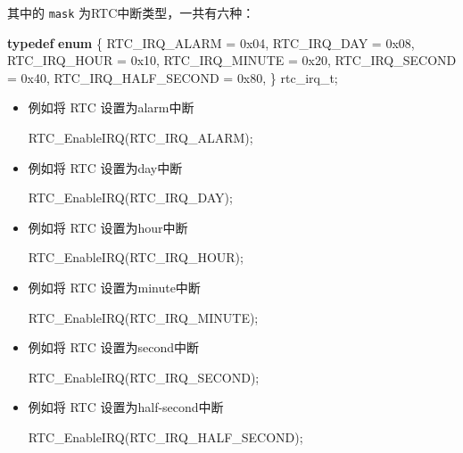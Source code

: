 \documentclass[
  12pt,
]{book}
\newenvironment{Shaded}{\begin{snugshade}}{\end{snugshade}}
\newcommand{\BaseNTok}[1]{\textcolor[rgb]{0.00,0.00,0.81}{#1}}
\newcommand{\KeywordTok}[1]{\textcolor[rgb]{0.13,0.29,0.53}{\textbf{#1}}}
\newcommand{\NormalTok}[1]{#1}
\begin{document}
其中的 \texttt{mask} 为RTC中断类型，一共有六种：

\begin{Shaded}
\begin{Highlighting}[]
\KeywordTok{typedef} \KeywordTok{enum}
\NormalTok{\{}
\NormalTok{    RTC_IRQ_ALARM = }\BaseNTok{0x04}\NormalTok{,}
\NormalTok{    RTC_IRQ_DAY = }\BaseNTok{0x08}\NormalTok{,}
\NormalTok{    RTC_IRQ_HOUR = }\BaseNTok{0x10}\NormalTok{,}
\NormalTok{    RTC_IRQ_MINUTE = }\BaseNTok{0x20}\NormalTok{,}
\NormalTok{    RTC_IRQ_SECOND = }\BaseNTok{0x40}\NormalTok{,}
\NormalTok{    RTC_IRQ_HALF_SECOND = }\BaseNTok{0x80}\NormalTok{,}
\NormalTok{\} rtc_irq_t;}
\end{Highlighting}
\end{Shaded}

\begin{itemize}
\item
  例如将 RTC 设置为alarm中断

\begin{Shaded}
\begin{Highlighting}[]
\NormalTok{RTC_EnableIRQ(RTC_IRQ_ALARM);}
\end{Highlighting}
\end{Shaded}
\item
  例如将 RTC 设置为day中断

\begin{Shaded}
\begin{Highlighting}[]
\NormalTok{RTC_EnableIRQ(RTC_IRQ_DAY);}
\end{Highlighting}
\end{Shaded}
\item
  例如将 RTC 设置为hour中断

\begin{Shaded}
\begin{Highlighting}[]
\NormalTok{RTC_EnableIRQ(RTC_IRQ_HOUR);}
\end{Highlighting}
\end{Shaded}
\item
  例如将 RTC 设置为minute中断

\begin{Shaded}
\begin{Highlighting}[]
\NormalTok{RTC_EnableIRQ(RTC_IRQ_MINUTE);}
\end{Highlighting}
\end{Shaded}
\item
  例如将 RTC 设置为second中断

\begin{Shaded}
\begin{Highlighting}[]
\NormalTok{RTC_EnableIRQ(RTC_IRQ_SECOND);}
\end{Highlighting}
\end{Shaded}
\item
  例如将 RTC 设置为half-second中断

\begin{Shaded}
\begin{Highlighting}[]
\NormalTok{RTC_EnableIRQ(RTC_IRQ_HALF_SECOND);}
\end{Highlighting}
\end{Shaded}
\end{itemize}
\end{document}
